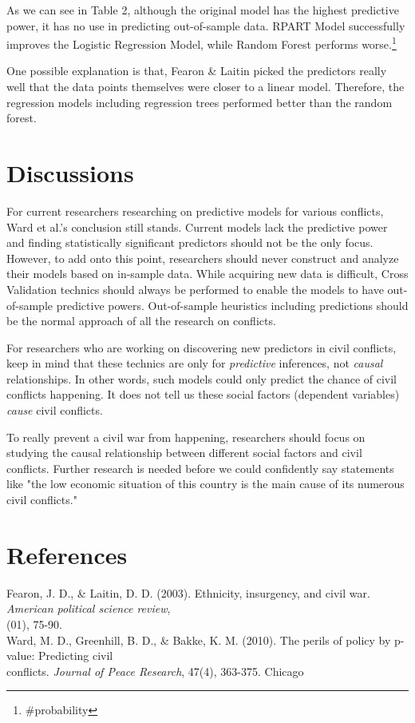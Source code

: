 \documentclass{article}
\begin{document}
As we can see in Table 2, although the original model has the highest predictive power, it has no use in predicting out-of-sample data. RPART Model successfully improves the Logistic Regression Model, while Random Forest performs worse.\footnote{\#probability}

One possible explanation is that, Fearon \& Laitin picked the predictors really well that the data points themselves were closer to a linear model. Therefore, the regression models including regression trees performed better than the random forest.  
\section{Discussions}
For current researchers researching on predictive models for various conflicts, Ward et al.'s conclusion still stands. Current models lack the predictive power and finding statistically significant predictors should not be the only focus. However, to add onto this point, researchers should never construct and analyze their models based on in-sample data. While acquiring new data is difficult, Cross Validation technics should always be performed to enable the models to have out-of-sample predictive powers. Out-of-sample heuristics including predictions should be the normal approach of all the research on conflicts.

For researchers who are working on discovering new predictors in civil conflicts, keep in mind that these technics are only for \textit{predictive} inferences, not \textit{causal} relationships. In other words, such models could only predict the chance of civil conflicts happening. It does not tell us these social factors (dependent variables) \textit{cause} civil conflicts. 

To really prevent a civil war from happening, researchers should focus on studying the causal relationship between different social factors and civil conflicts. Further research is needed before we could confidently say statements like "the low economic situation of this country is the main cause of its numerous civil conflicts."

\section{References}
Fearon, J. D., \& Laitin, D. D. (2003). Ethnicity, insurgency, and civil war. \textit{American political science review},\\ (01), 75-90. \\
Ward, M. D., Greenhill, B. D., \& Bakke, K. M. (2010). The perils of policy by p-value: Predicting civil\\ \indent conflicts. \textit{Journal of Peace Research}, 47(4), 363-375. Chicago	
\end{document}
